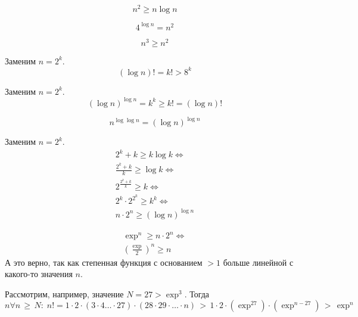 	\begin{proposition}
		\label{p11}
		$$n^2 \geq n\log n$$
	\end{proposition}
	
	\begin{proposition}
		\label{p12}
		$$4^{\log n} = n^2$$
	\end{proposition}

	\begin{proposition}
		\label{p13}
		$$n^3 \geq n^2$$
	\end{proposition}
	
	\begin{proposition}
		\label{p14}
		Заменим $n = 2^k$.
		$$\left(\log n\right)! = k! > 8^k$$
	\end{proposition}
	
	\begin{proposition}
		\label{p15}
		Заменим $n = 2^k$.
		$$\left(\log n\right)^{\log n} = k^k \geq k! = \left(\log n\right)!$$
	\end{proposition}
	
	\begin{proposition}
		\label{p16}
		$$n^{\log\log n} = \left(\log n\right)^{\log n}$$
	\end{proposition}
	
	\begin{proposition}
		\label{p17}
		Заменим $n = 2^k$.
		\begin{gather*}
		 2^k + k \geq k\log k \Leftrightarrow\\
		\frac{2^k+k}{k} \geq \log k \Leftrightarrow\\
		2^{\frac{2^k+k}{k}} \geq k \Leftrightarrow\\
		2^k\cdot 2^{2^k} \geq k^k \Leftrightarrow\\
		n\cdot 2^n \geq \left(\log n\right)^{\log n}
		\end{gather*}
	\end{proposition}
	
	\begin{proposition}
		\label{p18}
		\begin{gather*}
		\exp^n \geq n\cdot 2^n \Leftrightarrow\\
		\left(\frac{\exp}{2}\right)^n \geq n
		\end{gather*}
		А это верно, так как степенная функция с основанием $>1$ больше линейной с какого-то значения $n$.
		
	\end{proposition}
	
	\begin{proposition}
		\label{p19}
		Рассмотрим, например, значение $N = 27 > \exp^3$.
		Тогда $n\forall n \,\geq\, N:\; n! = 1\cdot2\cdot(3\cdot4\dotsc\cdot27) \cdot (28\cdot29\cdot\dotsc\cdot n) \,>\, 1\cdot2\cdot(\exp^{27})\cdot(\exp^{n-27}) \,>\, \exp^n$ 
	\end{proposition}
	
